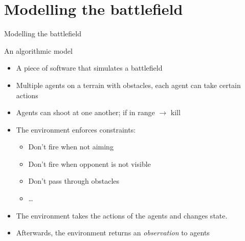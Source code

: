 \documentclass{beamer}
\begin{document}
\section{Modelling the battlefield}
\begin{frame}{Modelling the battlefield}
\begin{block}{An algorithmic model}
\begin{itemize}
    \item A piece of software that simulates a battlefield
    \item Multiple agents on a terrain with obstacles, each agent can take certain actions
    \item Agents can shoot at one another; if in range $\rightarrow$ kill
    \item The environment enforces constraints:
        \begin{itemize}
            \item Don't fire when not aiming
            \item Don't fire when opponent is not visible
            \item Don't pass through obstacles
            \item \ldots
        \end{itemize}
    \item The environment takes the actions of the agents and changes state.
    \item Afterwards, the environment returns an \emph{observation} to agents
\end{itemize}
\end{block}

\end{frame}
\end{document}
